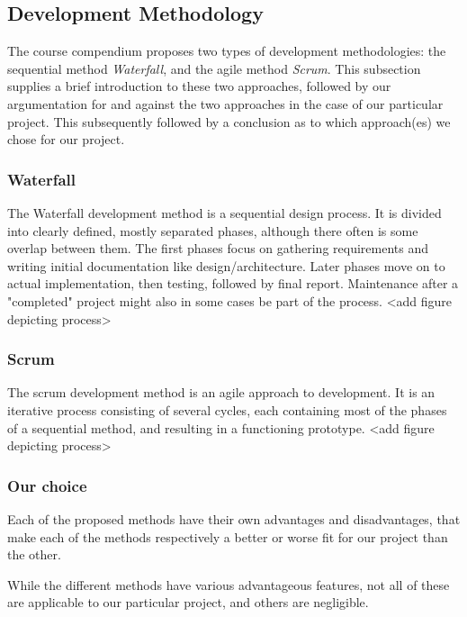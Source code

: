 \subsection{Development Methodology}
The course compendium proposes two types of development methodologies: the sequential method \emph{Waterfall}, and the agile method \emph{Scrum}. This subsection supplies a brief introduction to these two approaches, followed by our argumentation for and against the two approaches in the case of our particular project. This subsequently followed by a conclusion as to which approach(es) we chose for our project.
\subsubsection{Waterfall}
The Waterfall development method is a sequential design process. It is divided into clearly defined, mostly separated phases, although there often is some overlap between them. The first phases focus on gathering requirements and writing initial documentation like design/architecture. Later phases move on to actual implementation, then testing, followed by final report. Maintenance after a "completed" project might also in some cases be part of the process. <add figure depicting process>
\subsubsection{Scrum}
The scrum development method is an agile approach to development. It is an iterative process consisting of several cycles, each containing most of the phases of a sequential method, and resulting in a functioning prototype. <add figure depicting process>
\subsubsection{Our choice}
Each of the proposed methods have their own advantages and disadvantages, that make each of the methods respectively a better or worse fit for our project than the other.

While the different methods have various advantageous features, not all of these are applicable to our particular project, and others are negligible.

